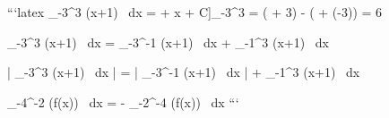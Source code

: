 \documentclass{article}
\begin{document}
```latex
\int_{-3}^3 (x+1) \, dx =  + x + C\Big]_{-3}^3 = ( + 3) - ( + (-3)) = 6
$$

\int_{-3}^3 (x+1) \, dx = \int_{-3}^{-1} (x+1) \, dx + \int_{-1}^{3} (x+1) \, dx

\left| \int_{-3}^3 (x+1) \, dx \right| = \left| \int_{-3}^{-1} (x+1) \, dx \right| + \int_{-1}^{3} (x+1) \, dx

\int_{-4}^{-2} (f(x)) \, dx = - \int_{-2}^{-4} (f(x)) \, dx
```
\end{document}
